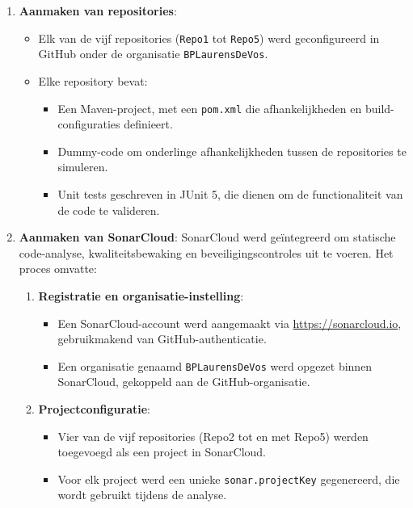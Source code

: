 \begin{enumerate}
    \item \textbf{Aanmaken van repositories}:
    \begin{itemize}
        \item Elk van de vijf repositories (\texttt{Repo1} tot \texttt{Repo5}) werd geconfigureerd in GitHub onder de organisatie \texttt{BPLaurensDeVos}. 
        \item Elke repository bevat:
        \begin{itemize}
            \item Een Maven-project, met een \texttt{pom.xml} die afhankelijkheden en build-configuraties definieert.
            \item Dummy-code om onderlinge afhankelijkheden tussen de repositories te simuleren.
            \item Unit tests geschreven in JUnit 5, die dienen om de functionaliteit van de code te valideren.
        \end{itemize}
    \end{itemize}
    
    \item \textbf{Aanmaken van SonarCloud}:
    SonarCloud werd geïntegreerd om statische code-analyse, kwaliteitsbewaking en beveiligingscontroles uit te voeren. Het proces omvatte:
    \begin{enumerate}
        \item \textbf{Registratie en organisatie-instelling}:
        \begin{itemize}
            \item Een SonarCloud-account werd aangemaakt via \url{https://sonarcloud.io}, gebruikmakend van GitHub-authenticatie.
            \item Een organisatie genaamd \texttt{BPLaurensDeVos} werd opgezet binnen SonarCloud, gekoppeld aan de GitHub-organisatie.
        \end{itemize}
        
        \item \textbf{Projectconfiguratie}:
        \begin{itemize}
            \item Vier van de vijf repositories (Repo2 tot en met Repo5) werden toegevoegd als een project in SonarCloud. 
            \item Voor elk project werd een unieke \texttt{sonar.projectKey} gegenereerd, die wordt gebruikt tijdens de analyse.
        \end{itemize}
        

\end{enumerate}
\end{enumerate}
